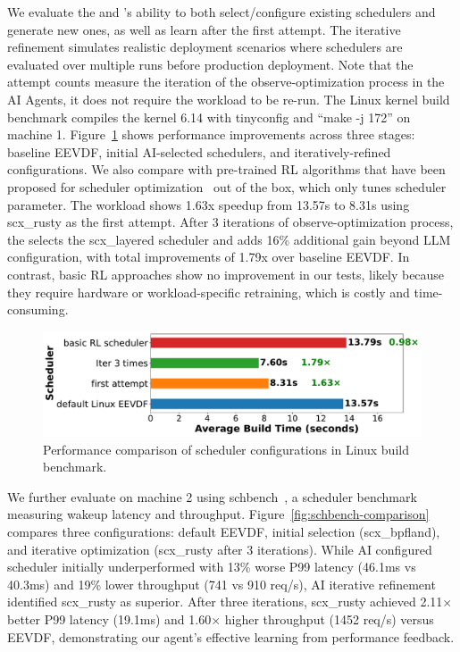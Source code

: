 
We evaluate the \sys and \agent's ability to both select/configure existing schedulers and generate new ones, as well as learn after the first attempt. The iterative refinement simulates realistic deployment scenarios where schedulers are evaluated over multiple runs before production deployment. Note that the attempt counts measure the iteration of the observe-optimization process in the AI Agents, it does not require the workload to be re-run. The Linux kernel build benchmark compiles the kernel 6.14 with tinyconfig and ``make -j 172'' on machine 1. Figure~\ref{fig:performance-comparison} shows performance improvements across three stages: baseline EEVDF, initial AI-selected schedulers, and iteratively-refined configurations. We also compare with pre-trained RL algorithms that have been proposed for scheduler optimization~\cite{corbet2025ml} out of the box, which only tunes scheduler parameter. The workload shows 1.63x speedup from 13.57s to 8.31s using scx\_rusty as the first attempt. After 3 iterations of observe-optimization process, the \agent selects the scx\_layered scheduler and adds 16\% additional gain beyond LLM configuration, with total improvements of 1.79x over baseline EEVDF. In contrast, basic RL approaches show no improvement in our tests, likely because they require hardware or workload-specific retraining, which is costly and time-consuming.

\begin{figure}[h]
\centering
\includegraphics[width=0.9\columnwidth]{sections/Linux_build_benchmark_results.pdf}
\caption{Performance comparison of scheduler configurations in Linux build benchmark.}
\label{fig:performance-comparison}
\end{figure}

We further evaluate \sys on machine 2 using schbench~\cite{schbench2016}, a scheduler benchmark measuring wakeup latency and throughput. Figure~\ref{fig:schbench-comparison} compares three configurations: default EEVDF, initial selection (scx\_bpfland), and iterative optimization (scx\_rusty after 3 iterations). While AI configured scheduler initially underperformed with 13\% worse P99 latency (46.1ms vs 40.3ms) and 19\% lower throughput (741 vs 910 req/s), AI iterative refinement identified scx\_rusty as superior. After three iterations, scx\_rusty achieved 2.11× better P99 latency (19.1ms) and 1.60× higher throughput (1452 req/s) versus EEVDF, demonstrating our agent's effective learning from performance feedback.

